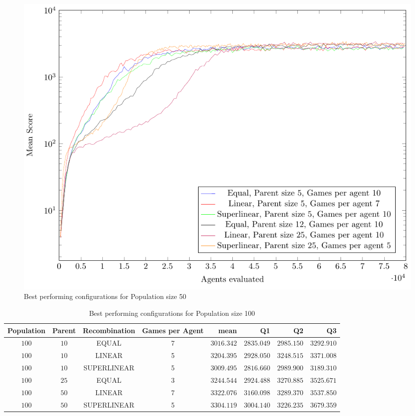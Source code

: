 \begin{figure}[H]
\centering
\includegraphics[scale=1]{data/cma_population_offspring/bestofeach_population/50x/PlotFile.pdf}
\caption{Best performing configurations for Population size 50}
\end{figure}

\clearpage

\begin{table}[H]
\centering
\small
\begin{tabular}{c c c c r r r r}
Population & Parent & Recombination & Games per Agent & mean & Q1 & Q2 & Q3\\
\hline
$100$ & $10$ & EQUAL & 7 & $3016.342$ & $2835.049$ & $2985.150$ & $3292.910$\\
$100$ & $10$ & LINEAR & 5 & $3204.395$ & $2928.050$ & $3248.515$ & $3371.008$\\
$100$ & $10$ & SUPERLINEAR & 5 & $3009.495$ & $2816.660$ & $2989.900$ & $3189.310$\\
$100$ & $25$ & EQUAL & 3 & $3244.544$ & $2924.488$ & $3270.885$ & $3525.671$\\
$100$ & $50$ & LINEAR & 7 & $3322.076$ & $3160.098$ & $3289.370$ & $3537.850$\\
$100$ & $50$ & SUPERLINEAR & 5 & $3304.119$ & $3004.140$ & $3226.235$ & $3679.359$\\
\end{tabular}
\caption{Best performing configurations for Population size 100}
\end{table}

